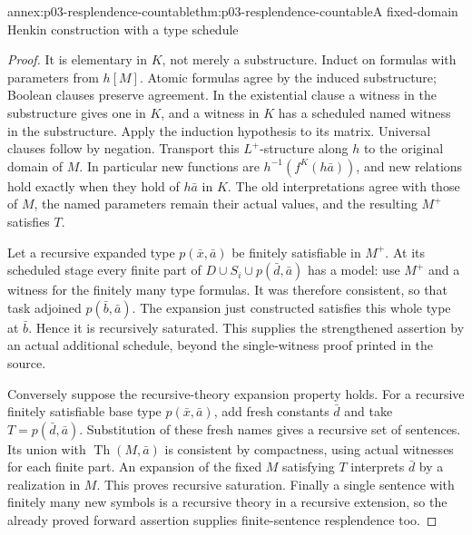 \begin{annexitem}{annex:p03-resplendence-countable}{thm:p03-resplendence-countable}{A fixed-domain Henkin construction with a type schedule}
\begin{proof}
It is elementary in \(K\), not merely a substructure. Induct on formulas
with parameters from \(h[M]\). Atomic formulas agree by the induced
substructure; Boolean clauses preserve agreement. In the existential
clause a witness in the substructure gives one in \(K\), and a witness
in \(K\) has a scheduled named witness in the substructure. Apply the
induction hypothesis to its matrix. Universal clauses follow by negation.
Transport this \(L^+\)-structure along \(h\) to the original domain
of \(M\). In particular new functions are
\(h^{-1}(f^K(h\bar a))\), and new relations hold exactly when they
hold of \(h\bar a\) in \(K\). The old interpretations agree with
those of \(M\), the named parameters remain their actual values, and
the resulting \(M^+\) satisfies \(T\).

Let a recursive expanded type \(p(\bar x,\bar a)\) be finitely
satisfiable in \(M^+\). At its scheduled stage every finite part of
\(D\cup S_i\cup p(\bar d,\bar a)\) has a model: use \(M^+\)
and a witness for the finitely many type formulas. It was therefore
consistent, so that task adjoined \(p(\bar b,\bar a)\). The expansion
just constructed satisfies this whole type at \(\bar b\). Hence it
is recursively saturated. This supplies the strengthened assertion by
an actual additional schedule, beyond the single-witness proof printed
in the source.

Conversely suppose the recursive-theory expansion property holds. For a
recursive finitely satisfiable base type \(p(\bar x,\bar a)\), add
fresh constants \(\bar d\) and take \(T=p(\bar d,\bar a)\).
Substitution of these fresh names gives a recursive set of sentences.
Its union with \(\operatorname{Th}(M,\bar a)\) is consistent by
compactness, using actual witnesses for each finite part. An expansion
of the fixed \(M\) satisfying \(T\) interprets \(\bar d\) by a
realization in \(M\). This proves recursive saturation. Finally a
single sentence with finitely many new symbols is a recursive theory in
a recursive extension, so the already proved forward assertion supplies
finite-sentence resplendence too.
\end{proof}
\end{annexitem}

